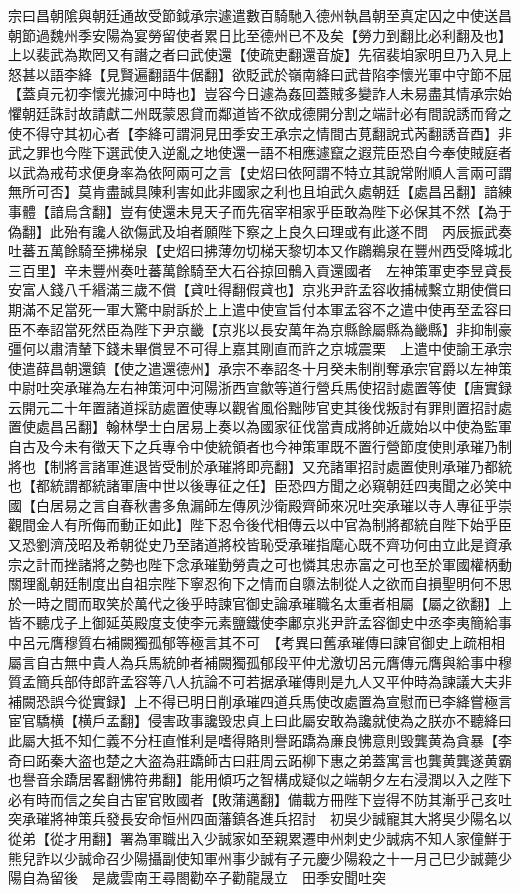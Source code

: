 宗曰昌朝隂與朝廷通故受節鉞承宗遽遣數百騎馳入德州執昌朝至真定囚之中使送昌朝節過魏州季安陽為宴勞留使者累日比至德州已不及矣【勞力到翻比必利翻及也】上以裴武為欺罔又有譖之者曰武使還【使疏吏翻還音旋】先宿裴垍家明旦乃入見上怒甚以語李絳【見賢遍翻語牛倨翻】欲貶武於嶺南絳曰武昔陷李懷光軍中守節不屈【蓋貞元初李懷光據河中時也】豈容今日遽為姦回蓋賊多變詐人未易盡其情承宗始懼朝廷誅討故請獻二州既蒙恩貸而鄰道皆不欲成德開分割之端計必有間說誘而脅之使不得守其初心者【李絳可謂洞見田季安王承宗之情間古莧翻說式芮翻誘音酉】非武之罪也今陛下選武使入逆亂之地使還一語不相應遽竄之遐荒臣恐自今奉使賊庭者以武為戒苟求便身率為依阿兩可之言【史炤曰依阿謂不特立其說常附順人言兩可謂無所可否】莫肯盡誠具陳利害如此非國家之利也且垍武久處朝廷【處昌呂翻】諳練事體【諳烏含翻】豈有使還未見天子而先宿宰相家乎臣敢為陛下必保其不然【為于偽翻】此殆有讒人欲傷武及垍者願陛下察之上良久曰理或有此遂不問　丙辰振武奏吐蕃五萬餘騎至拂梯泉【史炤曰拂薄勿切梯天黎切本又作鸊鵜泉在豐州西受降城北三百里】辛未豐州奏吐蕃萬餘騎至大石谷掠回鶻入貢還國者　左神策軍吏李昱貣長安富人錢八千緡滿三歲不償【貣吐得翻假貣也】京兆尹許孟容收捕械繫立期使償曰期滿不足當死一軍大驚中尉訴於上上遣中使宣旨付本軍孟容不之遣中使再至孟容曰臣不奉詔當死然臣為陛下尹京畿【京兆以長安萬年為京縣餘屬縣為畿縣】非抑制豪彊何以肅清輦下錢未畢償昱不可得上嘉其剛直而許之京城震栗　上遣中使諭王承宗使遣薛昌朝還鎮【使之遣還德州】承宗不奉詔冬十月癸未制削奪承宗官爵以左神策中尉吐突承璀為左右神策河中河陽浙西宣歙等道行營兵馬使招討處置等使【唐實録云開元二十年置諸道採訪處置使專以觀省風俗黜陟官吏其後伐叛討有罪則置招討處置使處昌呂翻】翰林學士白居易上奏以為國家征伐當責成將帥近歲始以中使為監軍自古及今未有徵天下之兵專令中使統領者也今神策軍既不置行營節度使則承璀乃制將也【制將言諸軍進退皆受制於承璀將即亮翻】又充諸軍招討處置使則承璀乃都統也【都統謂都統諸軍唐中世以後專征之任】臣恐四方聞之必窺朝廷四夷聞之必笑中國【白居易之言自春秋書多魚漏師左傳夙沙衛殿齊師來况吐突承璀以寺人專征乎崇觀間金人有所侮而動正如此】陛下忍令後代相傳云以中官為制將都統自陛下始乎臣又恐劉濟茂昭及希朝從史乃至諸道將校皆恥受承璀指麾心既不齊功何由立此是資承宗之計而挫諸將之勢也陛下念承璀勤勞貴之可也憐其忠赤富之可也至於軍國權柄動關理亂朝廷制度出自祖宗陛下寧忍徇下之情而自隳法制從人之欲而自損聖明何不思於一時之間而取笑於萬代之後乎時諫官御史論承璀職名太重者相屬【屬之欲翻】上皆不聽戊子上御延英殿度支使李元素鹽鐵使李鄘京兆尹許孟容御史中丞李夷簡給事中呂元膺穆質右補闕獨孤郁等極言其不可　【考異曰舊承璀傳曰諫官御史上疏相相屬言自古無中貴人為兵馬統帥者補闕獨孤郁段平仲尤激切呂元膺傳元膺與給事中穆質孟簡兵部侍郎許孟容等八人抗論不可若据承璀傳則是九人又平仲時為諫議大夫非補闕恐誤今從實録】上不得已明日削承璀四道兵馬使改處置為宣慰而已李絳嘗極言宦官驕横【横戶孟翻】侵害政事讒毁忠貞上曰此屬安敢為讒就使為之朕亦不聽絳曰此屬大抵不知仁義不分枉直惟利是嗜得賂則譽跖蹻為亷良怫意則毁龔黄為貪暴【李奇曰跖秦大盗也楚之大盗為莊蹻師古曰莊周云跖柳下惠之弟蓋寓言也龔黄龔遂黄霸也譽音余蹻居畧翻怫符弗翻】能用傾巧之智構成疑似之端朝夕左右浸潤以入之陛下必有時而信之矣自古宦官敗國者【敗蒲邁翻】備載方冊陛下豈得不防其漸乎己亥吐突承璀將神策兵發長安命恒州四面藩鎮各進兵招討　初吳少誠寵其大將吳少陽名以從弟【從才用翻】署為軍職出入少誠家如至親累遷申州刺史少誠病不知人家僮鮮于熊兒詐以少誠命召少陽攝副使知軍州事少誠有子元慶少陽殺之十一月己巳少誠薨少陽自為留後　是歲雲南王尋閤勸卒子勸龍晟立　田季安聞吐突